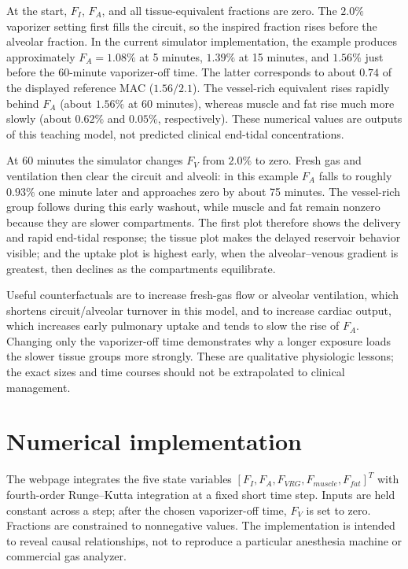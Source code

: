 \documentclass[11pt]{article}
\begin{document}
At the start, $F_I$, $F_A$, and all tissue-equivalent fractions are zero.  The $2.0\%$ vaporizer setting first fills the circuit, so the inspired fraction rises before the alveolar fraction.  In the current simulator implementation, the example produces approximately $F_A=1.08\%$ at 5 minutes, $1.39\%$ at 15 minutes, and $1.56\%$ just before the 60-minute vaporizer-off time.  The latter corresponds to about $0.74$ of the displayed reference MAC ($1.56/2.1$).  The vessel-rich equivalent rises rapidly behind $F_A$ (about $1.56\%$ at 60 minutes), whereas muscle and fat rise much more slowly (about $0.62\%$ and $0.05\%$, respectively).  These numerical values are outputs of this teaching model, not predicted clinical end-tidal concentrations.

At 60 minutes the simulator changes $F_V$ from $2.0\%$ to zero.  Fresh gas and ventilation then clear the circuit and alveoli: in this example $F_A$ falls to roughly $0.93\%$ one minute later and approaches zero by about 75 minutes.  The vessel-rich group follows during this early washout, while muscle and fat remain nonzero because they are slower compartments.  The first plot therefore shows the delivery and rapid end-tidal response; the tissue plot makes the delayed reservoir behavior visible; and the uptake plot is highest early, when the alveolar--venous gradient is greatest, then declines as the compartments equilibrate.

Useful counterfactuals are to increase fresh-gas flow or alveolar ventilation, which shortens circuit/alveolar turnover in this model, and to increase cardiac output, which increases early pulmonary uptake and tends to slow the rise of $F_A$.  Changing only the vaporizer-off time demonstrates why a longer exposure loads the slower tissue groups more strongly.  These are qualitative physiologic lessons; the exact sizes and time courses should not be extrapolated to clinical management.

\section{Numerical implementation}
The webpage integrates the five state variables $[F_I,F_A,F_{VRG},F_{muscle},F_{fat}]^T$ with fourth-order Runge--Kutta integration at a fixed short time step. Inputs are held constant across a step; after the chosen vaporizer-off time, $F_V$ is set to zero. Fractions are constrained to nonnegative values. The implementation is intended to reveal causal relationships, not to reproduce a particular anesthesia machine or commercial gas analyzer.
\end{document}
